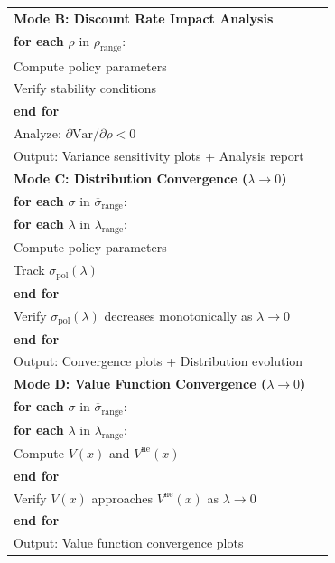 \documentclass[onecolumn, journal]{IEEEtran} %
\begin{document}
\begin{table}[h]
\begin{tabular}{@{}p{0.95\linewidth}@{}}
			\quad \textbf{Mode B: Discount Rate Impact Analysis}\\
			\quad \quad \textbf{for each} $\rho$ in $\rho_{\mathrm{range}}$:\\
			\quad \quad \quad Compute policy parameters\\
			\quad \quad \quad Verify stability conditions\\
			\quad \quad \textbf{end for}\\
			\quad \quad Analyze: $\partial \mathrm{Var}/\partial \rho < 0$\\
			\quad \quad Output: Variance sensitivity plots + Analysis report\\[2pt]
			
			\quad \textbf{Mode C: Distribution Convergence ($\lambda \to 0$)}\\
			\quad \quad \textbf{for each} $\sigma$ in $\overline{\sigma}_{\mathrm{range}}$:\\
			\quad \quad \quad \textbf{for each} $\lambda$ in $\lambda_{\mathrm{range}}$:\\
			\quad \quad \quad \quad Compute policy parameters\\
			\quad \quad \quad \quad Track $\sigma_{\mathrm{pol}}(\lambda)$\\
			\quad \quad \quad \textbf{end for}\\
			\quad \quad \quad Verify $\sigma_{\mathrm{pol}}(\lambda)$ decreases monotonically as $\lambda \to 0$\\
			\quad \quad \textbf{end for}\\
			\quad \quad Output: Convergence plots + Distribution evolution\\[2pt]
			
			\quad \textbf{Mode D: Value Function Convergence ($\lambda \to 0$)}\\
			\quad \quad \textbf{for each} $\sigma$ in $\overline{\sigma}_{\mathrm{range}}$:\\
			\quad \quad \quad \textbf{for each} $\lambda$ in $\lambda_{\mathrm{range}}$:\\
			\quad \quad \quad \quad Compute $V(x)$ and $V^{\mathrm{ne}}(x)$\\
			\quad \quad \textbf{end for}\\
			\quad \quad \quad Verify $V(x)$ approaches $V^{\mathrm{ne}}(x)$ as $\lambda \to 0$\\
			\quad \quad \textbf{end for}\\
			\quad \quad Output: Value function convergence plots\\
			\bottomrule
		\end{tabular}
	\end{table}
	
\end{document}
